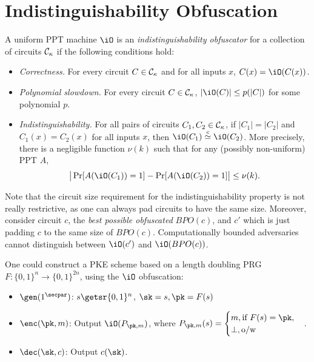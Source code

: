 \section{Indistinguishability Obfuscation}




\begin{definition}
A uniform PPT machine $\iO$ is an \emph{indistinguishability obfuscator}
for a collection of circuits $\mathcal{C}_{\kappa}$ if the following conditions hold:
\begin{itemize}

\item \emph{Correctness.}
For every circuit $C \in \mathcal{C}_{\kappa}$ and for all inputs $x$,
$C(x) = \iO(C(x))$.

\item \emph{Polynomial slowdown.}
For every circuit $C \in \mathcal{C}_{\kappa}$, $|\iO(C)| \leq p(|C|)$ for some
polynomial $p$.

\item \emph{Indistinguishability.}
For all pairs of circuits $C_1, C_2 \in \mathcal{C}_{\kappa}$, if $|C_1| = |C_2|$ and
$C_1(x) = C_2(x)$ for all inputs $x$, then
$\iO(C_1) \overset{c}{\simeq} \iO(C_2)$.
More precisely, there is a negligible function $\nu(k)$ such that for
any (possibly non-uniform) PPT $A$,
\begin{equation*}
\big| \Pr[A(\iO(C_1)) = 1] - \Pr[A(\iO(C_2)) = 1] \big| \leq \nu(k).
\end{equation*}

\end{itemize}
\end{definition}
Note that the circuit size requirement for the indistinguishability property is not really restrictive, as one can always pad circuits to have the same size. Moreover, consider circuit $c$, the \emph{best possible obfuscated} $BPO(c)$, and $c'$ which is just padding $c$ to the same size of $BPO(c)$. Computationally bounded adversaries cannot distinguish between $\iO(c')$ and $\iO(BPO(c))$.

One could construct a PKE scheme based on a length doubling PRG $F: \{0,1\}^n \to \{0,1\}^{2n}$, using the $\iO$ obfuscation: 
\begin{itemize}
    \item $\gen(1^\secpar)$: $s \getsr \{0,1\}^n$, $\sk = s, \pk = F(s)$
    \item $\enc(\pk, m)$: Output $\iO(P_{\pk, m})$, where $P_{\pk, m}(s) = \begin{cases}
	m, \hbox{if } F(s) = \pk, \\
	\bot, \hbox{o/w}
    \end{cases}$.
    \item $\dec(\sk, c)$: Output $c(\sk)$.
\end{itemize}


